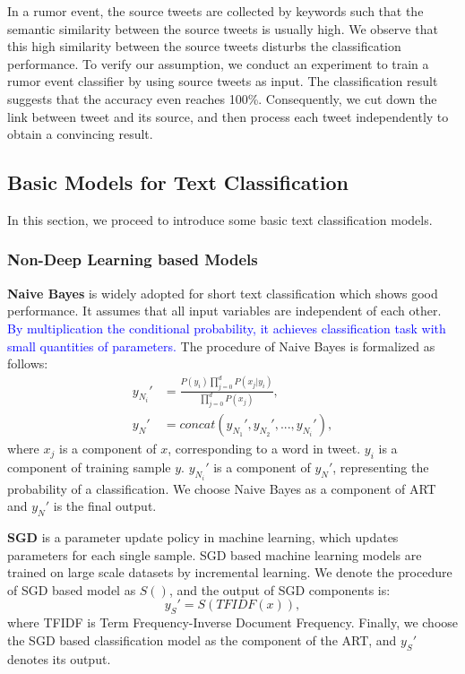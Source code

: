 In a rumor event, the source tweets are collected by keywords such that the semantic similarity between the source tweets is usually high. We observe that this high similarity between the source tweets disturbs the classification performance. To verify our assumption, we conduct an experiment to train a rumor event classifier by using source tweets as input. The classification result suggests that the accuracy even reaches 100\%. Consequently, we cut down the link between tweet and its source, and then process each tweet independently to obtain a convincing result. 

\subsection{Basic Models for Text Classification}
\label{sec:deeplearning_model} 
In this section, we proceed to introduce some basic text classification models.

\subsubsection{Non-Deep Learning based Models}
\textbf{Naive Bayes} \cite{DBLP:journals/ml/DomingosP97} is widely adopted for short text classification which shows good performance. It assumes that all input variables are independent of each other. \textcolor{blue}{By multiplication the conditional probability, it achieves classification task with small quantities of parameters.} The procedure of Naive Bayes is formalized as follows:
\begin{align}\label{eq:nb}
y_{N_{i}}' &= \frac{P(y_i)\prod_{j = 0}^d P(x_j|y_i)}{\prod_{j = 0}^d P(x_j)},\\
y_N' &= concat(y_{N_{1}}',y_{N_{2}}',..., y_{N_{i}}'),
\end{align}
where $x_j$ is a component of $x$, corresponding to a word in tweet.  $y_i$ is a component of training sample $y$. $y_{N_{i}}'$ is a component of $y_N'$, representing the probability of a classification. We choose Naive Bayes as  a component of ART and  $y_N'$ is the final output.

\textbf{SGD} \cite{avriel2003nonlinear} is a parameter update policy in machine learning, which updates parameters for each single sample. SGD based machine learning models are trained on large scale datasets by incremental learning. We denote the procedure of SGD based model as $S()$, and the output of SGD components is:
\begin{equation}\label{eq:sgd}
y_S' = S(TFIDF(x)),
\end{equation}
where TFIDF is Term Frequency-Inverse Document Frequency. Finally, we choose the SGD based classification model as the component of the ART, and $y_S'$ denotes its output.

